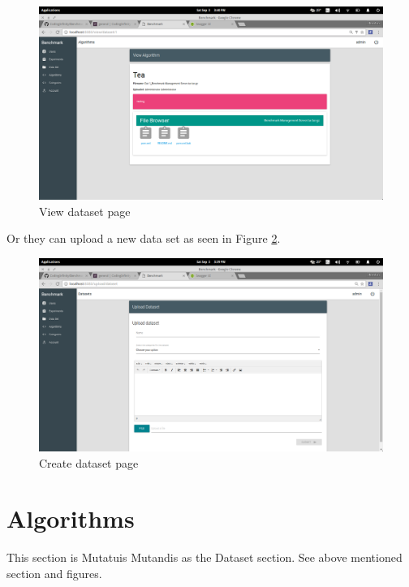 \documentclass[11pt,a4paper]{article}
\begin{document}
\begin{figure}[H]
	\begin{center}
		\includegraphics[scale=0.3]{../Images/User Manual/View Dataset.png}
		\caption{View dataset page}
		\label{fig:viewData}
	\end{center}  
\end{figure}
\clearpage
Or they can upload a new data set as seen in Figure \ref {fig:createData}.
\begin{figure}[H]
	\begin{center}
		\includegraphics[scale=0.3]{../Images/User Manual/Upload Dataset.png}
		\caption{Create dataset page}
		\label{fig:createData}
	\end{center}  
\end{figure}
\clearpage
\section{Algorithms}
This section is Mutatuis Mutandis as the Dataset section. See above mentioned section and figures.
\end{document}
